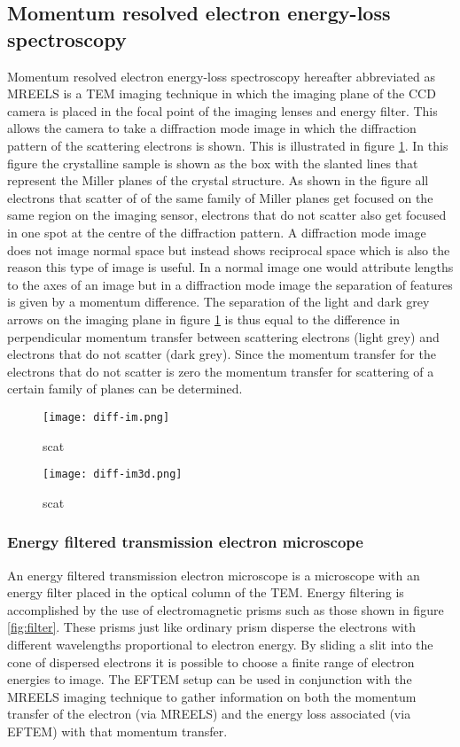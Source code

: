 \subsection{Momentum resolved electron energy-loss spectroscopy}
\label{sec:MREELS}
Momentum resolved electron energy-loss spectroscopy hereafter abbreviated as MREELS is a TEM imaging technique in which the imaging plane of the CCD camera is placed in the focal point of the imaging lenses and energy filter.
This allows the camera to take a diffraction mode image in which the diffraction pattern of the scattering electrons is shown. This is illustrated in figure \ref{fig:diff-im}. In this figure the crystalline sample is shown as the box with the slanted lines that represent the Miller planes of the crystal structure.
As shown in the figure all electrons that scatter of of the same family of Miller planes get focused on the same region on the imaging sensor, electrons that do not scatter also get focused in one spot at the centre of the diffraction pattern.
A diffraction mode image does not image normal space but instead shows reciprocal space which is also the reason this type of image is useful. In a normal image one would attribute lengths to the axes of an image but in a diffraction mode image the separation of features is given by a momentum difference.
The separation of the light and dark grey arrows on the imaging plane in figure \ref{fig:diff-im} is thus equal to the difference in perpendicular momentum transfer between scattering electrons (light grey) and electrons that do not scatter (dark grey).
Since the momentum transfer for the electrons that do not scatter is zero the momentum transfer for scattering of a certain family of planes can be determined.


\begin{figure}
	\centering
	\texttt{[image: diff-im.png]}
	\caption{scat}
	\label{fig:diff-im}
\end{figure}
\begin{figure}
	\centering
	\texttt{[image: diff-im3d.png]}
	\caption{scat}
	\label{fig:diff-im3d}
\end{figure}
\subsubsection{Energy filtered transmission electron microscope}
\label{sec:eftem}
An energy filtered transmission electron microscope is a microscope with an energy filter placed in the optical column of the TEM. Energy filtering is accomplished by the use of electromagnetic prisms such as those shown in figure \ref{fig:filter}.
These prisms just like ordinary prism disperse the electrons with different wavelengths proportional to electron energy. By sliding a slit into the cone of dispersed electrons it is possible to choose a finite range of electron energies to image.
The EFTEM setup can be used in conjunction with the MREELS imaging technique to gather information on both the momentum transfer of the electron (via MREELS) and the energy loss associated (via EFTEM) with that momentum transfer.


